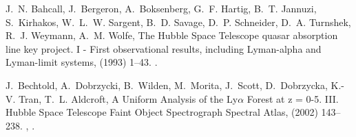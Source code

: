 \documentclass[12pt]{elsarticle}
\begin{document}
\begin{thebibliography}{10}
J.~N. {Bahcall}, J.~{Bergeron}, A.~{Boksenberg}, G.~F. {Hartig}, B.~T.
  {Jannuzi}, S.~{Kirhakos}, W.~L.~W. {Sargent}, B.~D. {Savage}, D.~P.
  {Schneider}, D.~A. {Turnshek}, R.~J. {Weymann}, A.~M. {Wolfe}, {The Hubble
  Space Telescope quasar absorption line key project. I - First observational
  results, including Lyman-alpha and Lyman-limit systems},  (1993)
  1--43.
\newblock \href {http://dx.doi.org/10.1086/191797} {}.

J.~{Bechtold}, A.~{Dobrzycki}, B.~{Wilden}, M.~{Morita}, J.~{Scott},
  D.~{Dobrzycka}, K.-V. {Tran}, T.~L. {Aldcroft}, {A Uniform Analysis of the
  Ly{$\alpha$} Forest at z = 0-5. III. Hubble Space Telescope Faint Object
  Spectrograph Spectral Atlas},  (2002) 143--238.
\newblock \href {http://arxiv.org/abs/astro-ph/0111486}
  {}, \href {http://dx.doi.org/10.1086/342489}
  {}.


\end{thebibliography}
\end{document}
